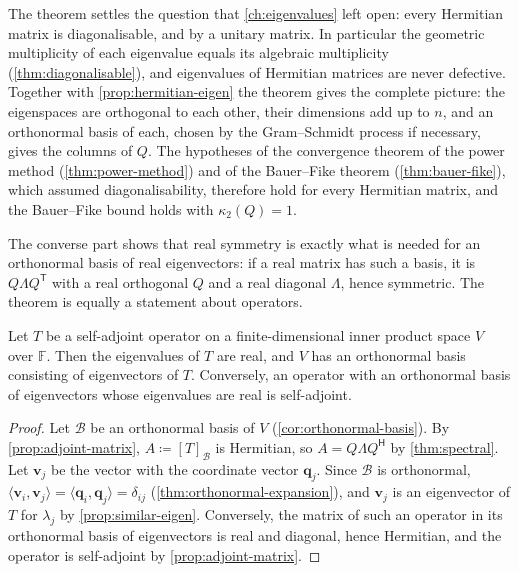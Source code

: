 The theorem settles the question that \cref{ch:eigenvalues} left open: every Hermitian matrix is diagonalisable, and by a unitary matrix. In particular the geometric multiplicity of each eigenvalue equals its algebraic multiplicity (\cref{thm:diagonalisable}), and eigenvalues of Hermitian matrices are never defective. Together with \cref{prop:hermitian-eigen} the theorem gives the complete picture: the eigenspaces are orthogonal to each other, their dimensions add up to $n$, and an orthonormal basis of each, chosen by the Gram--Schmidt process if necessary, gives the columns of $Q$. The hypotheses of the convergence theorem of the power method (\cref{thm:power-method}) and of the Bauer--Fike theorem (\cref{thm:bauer-fike}), which assumed diagonalisability, therefore hold for every Hermitian matrix, and the Bauer--Fike bound holds with $\kappa_2(Q)=1$.

The converse part shows that real symmetry is exactly what is needed for an orthonormal basis of real eigenvectors: if a real matrix has such a basis, it is $Q\Lambda Q^{\mathsf T}$ with a real orthogonal $Q$ and a real diagonal $\Lambda$, hence symmetric. The theorem is equally a statement about operators.

\begin{corollary}
\label{cor:spectral-operator}
Let $T$ be a self-adjoint operator on a finite-dimensional inner product space $V$ over $\mathbb F$. Then the eigenvalues of $T$ are real, and $V$ has an orthonormal basis consisting of eigenvectors of $T$. Conversely, an operator with an orthonormal basis of eigenvectors whose eigenvalues are real is self-adjoint.
\end{corollary}

\begin{proof}
Let $\mathcal B$ be an orthonormal basis of $V$ (\cref{cor:orthonormal-basis}). By \cref{prop:adjoint-matrix}, $A\coloneqq[T]_{\mathcal B}$ is Hermitian, so $A=Q\Lambda Q^{\mathsf H}$ by \cref{thm:spectral}. Let $\mathbf v_j$ be the vector with the coordinate vector $\mathbf q_j$. Since $\mathcal B$ is orthonormal, $\langle\mathbf v_i,\mathbf v_j\rangle=\langle\mathbf q_i,\mathbf q_j\rangle=\delta_{ij}$ (\cref{thm:orthonormal-expansion}), and $\mathbf v_j$ is an eigenvector of $T$ for $\lambda_j$ by \cref{prop:similar-eigen}. Conversely, the matrix of such an operator in its orthonormal basis of eigenvectors is real and diagonal, hence Hermitian, and the operator is self-adjoint by \cref{prop:adjoint-matrix}.
\end{proof}

